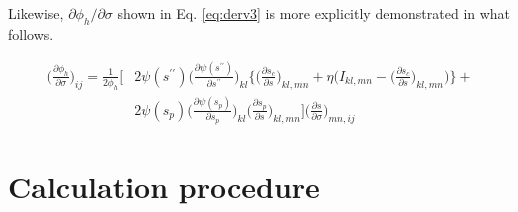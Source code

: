 \documentclass[12pt]{amsart}
\begin{document}
Likewise, $\partial\phi_h/\partial\sigma$ shown in Eq. \ref{eq:derv3} is more explicitly demonstrated in what follows.


\begin{equation}
  \label{eq:dphih_dsig}
  \begin{split}
    \Big(\frac{\partial\phi_h}{\partial\sigma}\Big)_{ij} = \frac{1}{2\phi_h}\Bigg[& 2\psi(s^{\prime\prime})\Big(\frac{\partial\psi(s^{\prime\prime})}{\partial s^{\prime\prime}}\Big)_{kl}
    \bigg\{
    \bigg( \frac{\partial s_c}{\partial s}\bigg)_{kl,mn} + \eta \bigg(I_{kl,mn} -   \bigg(\frac{\partial s_c}{\partial s}\bigg)_{kl,mn} \bigg)
    \bigg\} + \\
    & 2\psi(s_p) \Big(\frac{\partial \psi(s_p) }{\partial s_p}\Big)_{kl}
    \Big(
    \frac{\partial s_p}{\partial s}
    \Big)_{kl,mn}
    \Bigg]
    \Big(\frac{\partial s}{\partial \sigma}\Big)_{mn,ij}
  \end{split}
\end{equation}

\newpage
\section{Calculation procedure}
\label{sec:prc}
\end{document}
